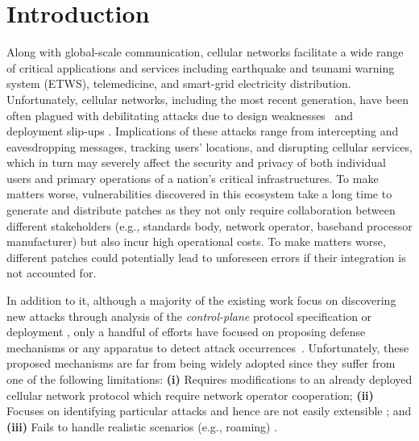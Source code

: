 \section{Introduction}
Along with global-scale communication, cellular networks facilitate
a wide range of critical applications and services including
earthquake and tsunami warning system (ETWS), telemedicine, and smart-grid electricity distribution.
Unfortunately, cellular networks, including the most recent generation, have been often plagued with debilitating
attacks due to design weaknesses~\cite{lteinspector, TORPEDO, 5g_reasoner, 5Gformal_authentication_basin}
and deployment slip-ups \cite{privacy_ndss16, kim_ltefuzz_sp19, lte_redirection,how_not_to_break_crypto}.
Implications of these attacks range from intercepting and eavesdropping messages, tracking users' locations,
and disrupting cellular services, which in turn may severely affect the security and privacy of both
individual users and primary operations of a nation's critical infrastructures. To make matters worse,
vulnerabilities discovered in this ecosystem take a long time to generate and distribute patches as they not only
require collaboration between different stakeholders (e.g., standards body, network operator,
baseband processor manufacturer) but also
incur high operational costs. To make matters worse, different patches could potentially lead to
unforeseen errors if their integration is not accounted for.

In addition to it, although a majority of the existing work focus on discovering new attacks through analysis of the \emph{control-plane} protocol
specification or deployment \cite{lteinspector, TORPEDO, privacy_ndss16, kim_ltefuzz_sp19, 5Gformal_authentication_basin,
5g_reasoner, lte_redirection, how_not_to_break_crypto}, only a handful of efforts have focused on proposing defense mechanisms or
any apparatus to detect attack occurrences~\cite{imsi_catcher_catchers, FBSRADAR, mobile_self_defense, FBSleuth, wisec_root}.
Unfortunately, these proposed mechanisms are far from being widely adopted since they suffer from one of the following
limitations: \textbf{(i)} Requires modifications to an already deployed cellular network protocol \cite{wisec_root} which require
network operator cooperation;
\textbf{(ii)} Focuses on identifying particular attacks and hence are not easily extensible \cite{imsi_catcher_catchers, FBSRADAR,
mobile_self_defense, FBSleuth}; and
\textbf{(iii)} Fails to handle realistic scenarios (e.g., roaming) \cite{wisec_root}.

